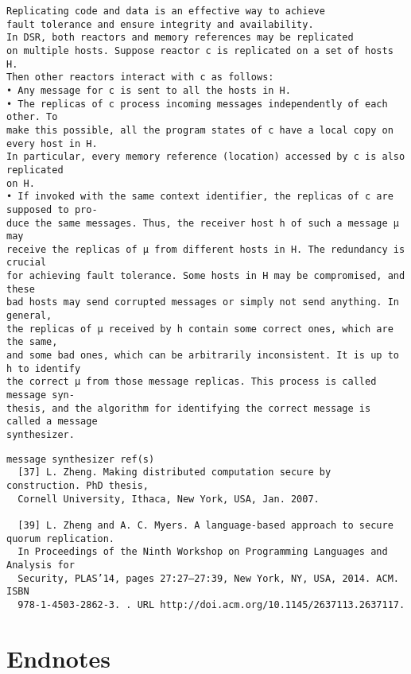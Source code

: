 \documentclass[%
dvipsnames,handout]{article}
\theoremstyle{definition}
\newenvironment{theendnotes}{}{}%
\newenvironment{theapx}{}{}%
\begin{document}
\begin{theapx}
\begin{verbatim}
Replicating code and data is an effective way to achieve
fault tolerance and ensure integrity and availability.
In DSR, both reactors and memory references may be replicated
on multiple hosts. Suppose reactor c is replicated on a set of hosts H.
Then other reactors interact with c as follows:
• Any message for c is sent to all the hosts in H.
• The replicas of c process incoming messages independently of each other. To
make this possible, all the program states of c have a local copy on every host in H.
In particular, every memory reference (location) accessed by c is also replicated
on H.
• If invoked with the same context identifier, the replicas of c are supposed to pro-
duce the same messages. Thus, the receiver host h of such a message µ may
receive the replicas of µ from different hosts in H. The redundancy is crucial
for achieving fault tolerance. Some hosts in H may be compromised, and these
bad hosts may send corrupted messages or simply not send anything. In general,
the replicas of µ received by h contain some correct ones, which are the same,
and some bad ones, which can be arbitrarily inconsistent. It is up to h to identify
the correct µ from those message replicas. This process is called message syn-
thesis, and the algorithm for identifying the correct message is called a message
synthesizer.
\end{verbatim}

\begin{verbatim}
message synthesizer ref(s)
  [37] L. Zheng. Making distributed computation secure by construction. PhD thesis,
  Cornell University, Ithaca, New York, USA, Jan. 2007.

  [39] L. Zheng and A. C. Myers. A language-based approach to secure quorum replication.
  In Proceedings of the Ninth Workshop on Programming Languages and Analysis for
  Security, PLAS’14, pages 27:27–27:39, New York, NY, USA, 2014. ACM. ISBN
  978-1-4503-2862-3. . URL http://doi.acm.org/10.1145/2637113.2637117.
\end{verbatim}



  
\end{theapx}
\begin{theendnotes}

\section{Endnotes}
\printendnotes

\end{theendnotes}


\end{document}
